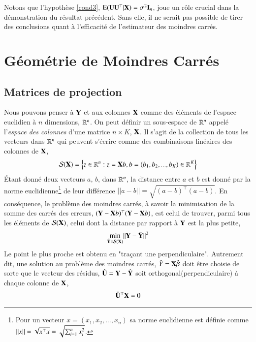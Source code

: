 \documentclass[10pt, reqno]{amsart}
\begin{document}
Notons que l'hypothèse \eqref{cond3}, $\operatorname{E}(\mathbf U\mathbf U^\top|\mathbf X )=\sigma^2\mathbf{I}_n$, joue un rôle crucial dans la démonstration du résultat précédent. Sans elle, il ne serait pas possible de tirer des conclusions quant à  l'efficacité de l'estimateur des moindres carrés.


\newpage

\section{Géométrie de Moindres Carrés}

\subsection{Matrices de projection}
Nous pouvons penser à $\mathbf Y$ et aux colonnes $\mathbf X$ comme des éléments de l'espace euclidien à $n$ dimensions, $\mathbb{R}^n$. On peut définir un sous-espace de $\mathbb{R}^n$ appelé l'\emph{espace des colonnes} d'une matrice $n\times K$, $\mathbf X$. Il s'agit de la collection de tous les vecteurs dans $\mathbb{R}^n$ qui peuvent s'écrire comme des combinaisons linéaires des colonnes de $\mathbf X$,
\begin{align*}
\mathcal{S}(\mathbf X) = \left\{z \in \mathbb{R}^n: z = \mathbf X b, b = (b_1, b_2,...,b_K) \in \mathbb{R}^K  \right\}
\end{align*}
\'Etant donné deux vecteurs $a$, $b$, dans $\mathbb{R}^n$, la distance entre $a$ et $b$ est donné par la norme euclidienne\footnote{Pour un vecteur $x=(x_1, x_2,...,x_n)$ sa norme euclidienne est définie comme $||x|| = \sqrt{x^\top x} = \sqrt{\sum_{i=1}^n x_i^2}$.} de leur différence $||a-b|| = \sqrt{(a-b)^\top(a-b)}$. En conséquence, le problème des moindres carrés, à savoir la minimisation de la somme des carrés des erreurs, $(\mathbf Y-\mathbf X b)^\top(\mathbf Y-\mathbf X b)$, est celui de trouver, parmi tous les éléments de $\mathcal{S}(\mathbf X)$, celui dont la distance par rapport à $\mathbf Y$ est la plus petite,
\begin{align*}
\underset{\tilde{\mathbf Y}\in \mathcal{S}(\mathbf X)}{\min} ||\mathbf Y - \tilde{\mathbf Y}||^2
\end{align*}
Le point le plus proche est obtenu en "traçant une perpendiculaire". Autrement dit, une solution au problème des moindres carrés, $\hat{Y} = \mathbf X\hat{\beta}$ doit être choisie de sorte que le vecteur des résidus, $\hat{\mathbf U} = \mathbf Y-\hat{\mathbf Y}$ soit orthogonal(perpendiculaire) à chaque colonne de $\mathbf X$,
\begin{align*}
\hat{\mathbf U}^\top\mathbf X = 0
\end{align*}
\end{document}

